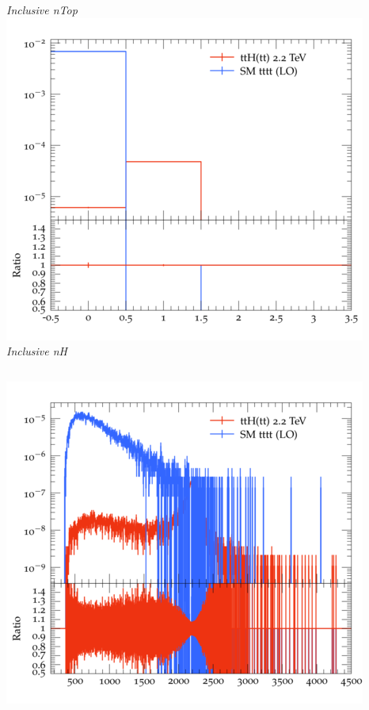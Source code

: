 \documentclass{beamer}
\begin{document}
\begin{frame}
\begin{columns}
\textit{\small Inclusive nTop}
\includegraphics[width=\textwidth]{../plots/ttH_2200/tttt_ttH/Inclusive_nH.png}\\
\textit{\small Inclusive nH}
\end{columns}
\begin{columns}
\includegraphics[width=\textwidth]{../plots/ttH_2200/tttt_ttH/Inclusive_InvM_ttbar12.png}\\

\end{columns}
\end{frame}
\end{document}
